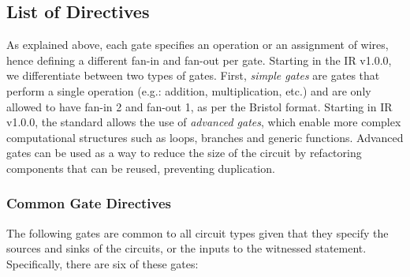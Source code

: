 \subsection{List of Directives}\label{gateset}

As explained above, each gate specifies an operation or an assignment of wires, hence defining a different fan-in and fan-out per gate. Starting in the IR v1.0.0, we differentiate between two types of gates. First, \emph{simple gates} are gates that perform a single operation (e.g.: addition, multiplication, etc.) and are only allowed to have fan-in 2 and fan-out 1, as per the Bristol format. Starting in IR v1.0.0, the standard allows the use of \emph{advanced gates}, which enable more complex computational structures such as loops, branches and generic functions. Advanced gates can be used as a way to reduce the size of the circuit by refactoring components that can be reused, preventing duplication.


\subsubsection{Common Gate Directives}\label{sec:common-gates}

The following gates are common to all circuit types given that they specify the sources and sinks of the circuits, or the inputs to the witnessed statement.
Specifically, there are six of these gates:\\

